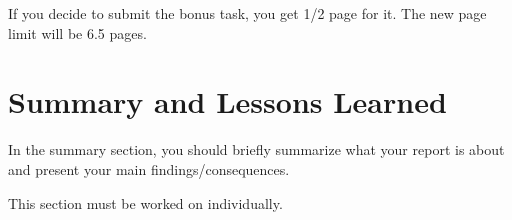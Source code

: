 \documentclass[conference]{IEEEtran}
\begin{document}
If you decide to submit the bonus task, you get 1/2 page for it. The new page limit will be 6.5 pages.
\section{Summary and Lessons Learned}
\label{sec:summary}
In the summary section, you should briefly summarize what your report is about and present your main findings/consequences.

This section must be worked on individually.



\end{document}
